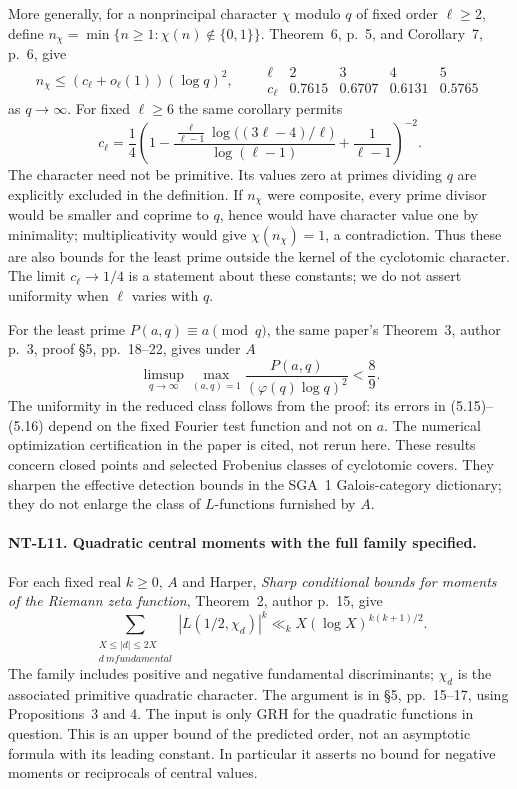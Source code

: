 More generally, for a nonprincipal character $\chi$ modulo $q$ of
fixed order $\ell\ge2$, define
$n_\chi=\min\{n\ge1:\chi(n)\notin\{0,1\}\}$.
Theorem~6, p.~5, and Corollary~7, p.~6, give
\[
 n_\chi\le(c_\ell+o_\ell(1))(\log q)^2,
 \qquad
 \begin{array}{c|rrrr}
   \ell&2&3&4&5\\ \hline
   c_\ell&0.7615&0.6707&0.6131&0.5765
 \end{array}
\tag{NT-P15}
\]
as $q\to\infty$.  For fixed $\ell\ge6$ the same corollary permits
\[
 c_\ell=\frac14\left(
  1-\frac{\frac{\ell}{\ell-1}\log\bigl((3\ell-4)/\ell\bigr)}
             {\log(\ell-1)}+\frac1{\ell-1}\right)^{-2}.
\]
The character need not be primitive.  Its values zero at primes
dividing $q$ are explicitly excluded in the definition.  If
$n_\chi$ were composite, every prime divisor would be smaller and
coprime to $q$, hence would have character value one by minimality;
multiplicativity would give $\chi(n_\chi)=1$, a contradiction.
Thus these are also bounds for the least prime outside the kernel
of the cyclotomic character.  The limit $c_\ell\to1/4$ is a
statement about these constants; we do not assert uniformity when
$\ell$ varies with $q$.

For the least prime $P(a,q)\equiv a\pmod q$, the same paper's
Theorem~3, author p.~3, proof \S5, pp.~18--22, gives under $A$
\[
 \limsup_{q\to\infty}
  \max_{(a,q)=1}\frac{P(a,q)}{(\varphi(q)\log q)^2}<\frac89.
\tag{NT-P16}
\]
The uniformity in the reduced class follows from the proof: its
errors in (5.15)--(5.16) depend on the fixed Fourier test function
and not on $a$.  The numerical optimization certification in the
paper is cited, not rerun here.  These results concern closed points
and selected Frobenius classes of cyclotomic covers.  They sharpen
the effective detection bounds in the SGA~1 Galois-category
dictionary; they do not enlarge the class of $L$-functions furnished
by $A$.

\paragraph{NT-L11. Quadratic central moments with the full family specified.}
For each fixed real $k\ge0$, $A$ and Harper,
\emph{Sharp conditional bounds for moments of the Riemann zeta
function}, Theorem~2, author p.~15, give
\[
 \sum_{\substack{X\le |d|\le2X\\d\ {
m fundamental}}}
       |L(1/2,\chi_d)|^k
     \ll_k X(\log X)^{k(k+1)/2}.
\tag{NT-L11}
\]
The family includes positive and negative fundamental discriminants;
$\chi_d$ is the associated primitive quadratic character.  The
argument is in \S5, pp.~15--17, using Propositions~3 and 4.
The input is only GRH for the quadratic functions in question.
This is an upper bound of the predicted order, not an asymptotic
formula with its leading constant.  In particular it asserts no
bound for negative moments or reciprocals of central values.

